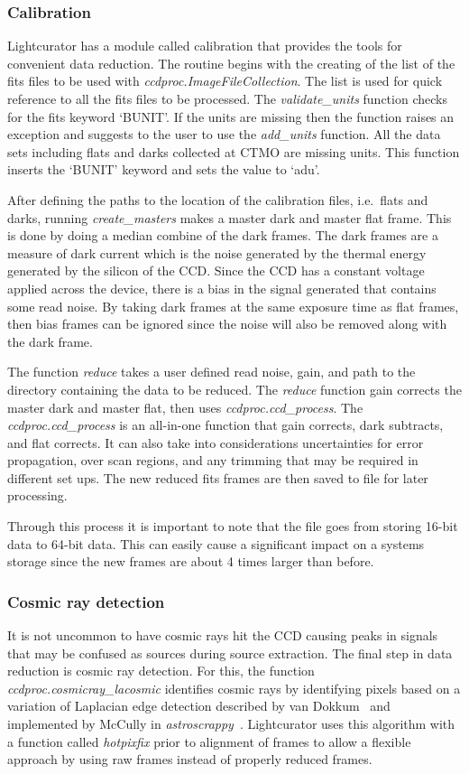 \subsubsection{Calibration}
Lightcurator has a module called calibration that provides the tools for convenient data reduction.
The routine begins with the creating of the list of the fits files to be used
with \textit{ccdproc.ImageFileCollection}.
The list is used for quick reference to all the fits files to be processed.
The \textit{validate\_units} function checks for the fits keyword `BUNIT'. 
If the units are missing then the function raises an exception and suggests
to the user to use the \textit{add\_units} function. 
All the data sets including flats and darks collected at CTMO are missing units.
This function inserts the `BUNIT' keyword and sets the value to `adu'.

After defining the paths to the location of the calibration files, i.e.\
flats and darks, running \textit{create\_masters} makes a master dark and master flat frame.
This is done by doing a median combine of the dark frames. 
The dark frames are a measure of dark current which is the noise generated by the thermal energy generated by the silicon of the CCD\@.
Since the CCD has a constant voltage applied across the device, there is a bias in the signal generated that contains some read noise.
By taking dark frames at the same exposure time as flat frames, then bias frames can be ignored since the noise will also be removed along
with the dark frame.

The function \textit{reduce} takes a user defined read noise, gain, and
path to the directory containing the data to be reduced. 
The \textit{reduce} function gain corrects the master dark and master flat, then
uses \textit{ccdproc.ccd\_process}. 
The \textit{ccdproc.ccd\_process } is an all-in-one function that gain corrects,
dark subtracts, and flat corrects. It can also take into considerations 
uncertainties for error propagation, over scan regions, and any trimming that
may be required in different set ups.
The new reduced fits frames are then saved to file for later processing.

Through this process it is important to note that the file goes from storing
16-bit data to 64-bit data.
This can easily cause a significant impact on a systems storage
since the new frames are about 4 times larger than before.

\subsubsection{Cosmic ray detection}
It is not uncommon to have cosmic rays hit the CCD causing peaks in signals that may be confused as sources during source extraction.
The final step in data reduction is cosmic ray detection.
For this, the function \textit{ccdproc.cosmicray\_lacosmic} identifies cosmic rays by identifying pixels based on a variation of
Laplacian edge detection described by van Dokkum~\cite{lacosmic} and implemented by McCully in \textit{astroscrappy}~\cite{astroscrappy}.
Lightcurator uses this algorithm with a function called \textit{hotpixfix} prior to alignment of frames to allow a flexible
approach by using raw frames instead of properly reduced frames.


